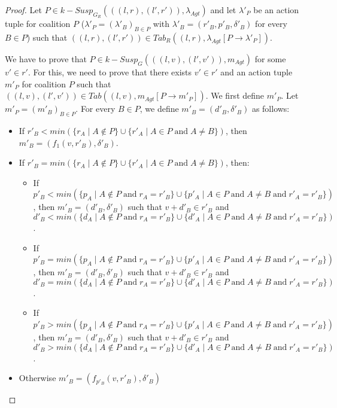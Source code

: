 \begin{proof}
Let $P \in k-Susp_{G_{R}}(((l, r), (l', r')), \lambda_{Agt})$ and let $\lambda'_{P}$ be an action tuple for coalition $P$ ($\lambda'_{P} = (\lambda'_{B})_{B\in P}$ with $\lambda'_{B} = (r'_{B}, p'_{B}, \delta'_{B})$ for every $B \in P$) such that $((l, r), (l', r')) \in Tab_{R}((l, r), \lambda_{Agt}[P \rightarrow \lambda'_{P}])$.

We have to prove that $P \in k-Susp_{G}(((l, v), (l', v')), m_{Agt})$ for some $v' \in r'$. For this, we need to prove that there exists $v' \in r'$ and an action tuple $m'_{P}$ for coalition $P$ such that $((l, v), (l', v')) \in Tab((l, v), m_{Agt}[P \rightarrow m'_{P}])$. We first define $m'_{P}$. Let $m'_{P} = (m'_{B})_{B\in P}$. For every $B \in P$, we define $m'_{B} = (d'_{B}, \delta'_{B})$ as follows:
\begin{itemize}
\item If $r'_{B} < min(\lbrace r_{A} \; \vert \; A \notin P \rbrace \cup \lbrace r'_{A} \; \vert \; A \in P \; \text{and} \; A \neq B \rbrace)$, then $m'_{B} = (f_{1}(v, r'_{B}), \delta'_{B})$.
\item If $r'_{B} = min(\lbrace r_{A} \; \vert \; A \notin P \rbrace \cup \lbrace r'_{A} \; \vert \; A \in P \; \text{and} \; A \neq B \rbrace)$, then:
\begin{itemize}
\item If $p'_{B} < min(\lbrace p_{A} \; \vert \; A \notin P \; \text{and} \; r_{A} = r'_{B} \rbrace \cup \lbrace p'_{A} \; \vert \; A \in P \; \text{and} \; A \neq B \; \text{and} \; r'_{A} = r'_{B} \rbrace)$, then $m'_{B} = (d'_{B}, \delta'_{B})$ such that $v + d'_{B} \in r'_{B}$ and $d'_{B} < min(\lbrace d_{A} \; \vert \; A \notin P \; \text{and} \; r_{A} = r'_{B} \rbrace \cup \lbrace d'_{A} \; \vert \; A \in P \; \text{and} \; A \neq B \; \text{and} \; r'_{A} = r'_{B} \rbrace)$.
\item If $p'_{B} = min(\lbrace p_{A} \; \vert \; A \notin P \; \text{and} \; r_{A} = r'_{B} \rbrace \cup \lbrace p'_{A} \; \vert \; A \in P \; \text{and} \; A \neq B \; \text{and} \; r'_{A} = r'_{B} \rbrace)$, then $m'_{B} = (d'_{B}, \delta'_{B})$ such that $v + d'_{B} \in r'_{B}$ and $d'_{B} = min(\lbrace d_{A} \; \vert \; A \notin P \; \text{and} \; r_{A} = r'_{B} \rbrace \cup \lbrace d'_{A} \; \vert \; A \in P \; \text{and} \; A \neq B \; \text{and} \; r'_{A} = r'_{B} \rbrace)$.
\item If $p'_{B} > min(\lbrace p_{A} \; \vert \; A \notin P \; \text{and} \; r_{A} = r'_{B} \rbrace \cup \lbrace p'_{A} \; \vert \; A \in P \; \text{and} \; A \neq B \; \text{and} \; r'_{A} = r'_{B} \rbrace)$, then $m'_{B} = (d'_{B}, \delta'_{B})$ such that $v + d'_{B} \in r'_{B}$ and $d'_{B} > min(\lbrace d_{A} \; \vert \; A \notin P \; \text{and} \; r_{A} = r'_{B} \rbrace \cup \lbrace d'_{A} \; \vert \; A \in P \; \text{and} \; A \neq B \; \text{and} \; r'_{A} = r'_{B} \rbrace)$.
\end{itemize}
\item Otherwise $m'_{B} = (f_{p'_{B}}(v, r'_{B}), \delta'_{B})$
\end{itemize}


\end{proof}
